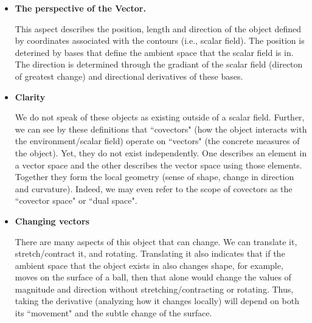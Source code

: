 \documentclass[12pt,a4paper]{report}
\begin{document}
\begin{description}
\begin{description}
\begin{itemize}
			This is really quite simple.  Picture the contours of the scalar values over the space (usually a surface).  Each contour is a line representing a constant value of our scalar (in a topographical map these lines would represent altitude).  The value of the covector \textit{of this object} at a point is the number of contours that the object (in the form of a line) passes through.  Thus, by definition the covector describes the space in question by describing how any of these objects passes.

			\item \textbf{The perspective of the Vector.}

			This aspect describes the position, length and direction of the object defined by coordinates associated with the contours (i.e., scalar field).  The position is deterined by bases that define the ambient space that the scalar field is in.  The direction is determined through the gradiant of the scalar field (directon of greatest change) and directional derivatives of these bases.

			\item \textbf{Clarity}

			We do not speak of these objects as existing outside of a scalar field.  Further, we can see by these definitions that ``covectors" (how the object interacts with the environment/scalar field) operate on ``vectors" (the concrete measures of the object).  Yet, they do not exist independently.  One describes an element in a vector space and the other describes the vector space using those elements.  Together they form the local geometry (sense of shape, change in direction and curvature).  Indeed, we may even refer to the scope of covectors as the ``covector space" or ``dual space".

		\item \textbf{Changing vectors}

		There are many aspects of this object that can change.  We can translate it, stretch/contract it, and rotating.  Translating it also indicates that if the ambient space that the object exists in also changes shape, for example, moves on the surface of a ball, then that alone would change the values of magnitude and direction without stretching/contracting or rotating.  Thus, taking the derivative (analyzing how it changes locally) will depend on both its ``movement" and the subtle change of the surface.
		\end{itemize}

\end{description}
\end{description}
\end{document}
